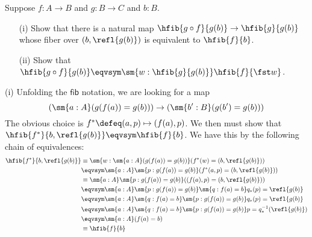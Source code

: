 Suppose $f : A \to B$ and $g : B \to C$ and $b : B$.
\begin{itemize}
  \item[(i)] Show that there is a natural map $\hfib{g \circ f}{g(b)} \to
      \hfib{g}{g(b)}$ whose fiber over $(b, \refl{g(b)})$ is equivalent to
      $\hfib{f}{b}$.
  \item[(ii)] Show that $\hfib{g \circ f}{g(b)} \eqvsym \sm{w:\hfib{g}{g(b)}}
      \hfib{f}{\fst w}$.
\end{itemize}


 \soln
(i) Unfolding the $\mathsf{fib}$ notation, we are looking for a map
\[
  \left(\sm{a:A} (g(f(a)) = g(b))\right) \to
  \left(\sm{b':B} (g(b') = g(b))\right)
\]
The obvious choice is $f^{*} \defeq (a, p) \mapsto (f(a), p)$.  We then must
show that $\hfib{f^{*}}{b, \refl{g(b)}} \eqvsym \hfib{f}{b}$.  We have this by
the following chain of equivalences:
\begin{align*}
  \hfib{f^{*}}{b, \refl{g(b)}}
  &\equiv
  \sm{w : \sm{a:A}(g(f(a)) = g(b))}(f^{*}(w) = (b, \refl{g(b)}))
  \\&\eqvsym
  \sm{a:A}\sm{p : g(f(a)) = g(b)}(f^{*}(a, p) = (b, \refl{g(b)}))
  \\&\equiv
  \sm{a:A}\sm{p : g(f(a)) = g(b)}((f(a), p) = (b, \refl{g(b)}))
  \\&\eqvsym
  \sm{a:A}\sm{p : g(f(a)) = g(b)}\sm{q : f(a) = b} q_{*}(p) = \refl{g(b)}
  \\&\eqvsym
  \sm{a:A}\sm{q : f(a) = b}\sm{p : g(f(a)) = g(b)} q_{*}(p) = \refl{g(b)}
  \\&\eqvsym
  \sm{a:A}\sm{q : f(a) = b}\sm{p : g(f(a)) = g(b)} p = q^{-1}_{*}(\refl{g(b)})
  \\&\eqvsym
  \sm{a:A}(f(a) = b)
  \\&\equiv
  \hfib{f}{b}
\end{align*}


